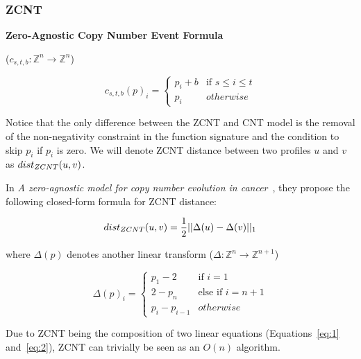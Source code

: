 \subsubsection{ZCNT}

{\bf Zero-Agnostic Copy Number Event Formula} 

($c_{s, t, b}: \mathbb{Z}^n \rightarrow \mathbb{Z}^n$) 

\begin{equation}
    c_{s, t, b}(p)_i = \begin{cases}
        p_i + b & \text{if } s \leq i \leq t \\ 
        p_i & otherwise
    \end{cases}
\end{equation}

Notice that the only difference between the ZCNT and CNT model is the removal of the non-negativity constraint in the function signature and the condition to skip $p_i$ if $p_i$ is zero. We will denote ZCNT distance between two profiles $u$ and $v$ as $dist_{ZCNT}(u, v)$. 

In {\it A zero-agnostic model for copy number evolution in cancer\/}~\cite{zcnt_paper}, they propose the following closed-form formula for ZCNT distance: 

\begin{equation} \label{eq:1}
    dist_{ZCNT}(u, v) = \frac{1}{2} ||\Delta (u) - \Delta (v)||_1
\end{equation}

where $\Delta (p)$ denotes another linear transform ($\Delta: \mathbb{Z}^{n} \rightarrow \mathbb{Z}^{n + 1}$)

\begin{equation} \label{eq:2}
    \Delta (p)_i = \begin{cases}
        p_1 - 2 & \text{if } i=1 \\ 
        2 - p_n & \text{else if } i=n+1 \\
        p_i - p_{i-1} & otherwise
    \end{cases}
\end{equation}

Due to ZCNT being the composition of two linear equations (Equations~\ref{eq:1} and~\ref{eq:2}), ZCNT can trivially be seen as an $O(n)$ algorithm. 